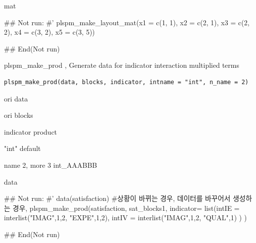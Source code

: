 \documentclass[a4paper]{book}
\begin{document}
%
\begin{Value}
mat
\end{Value}
%
\begin{Examples}
\begin{ExampleCode}

## Not run: 
#'
plspm_make_layout_mat(x1 = c(1, 1),
                      x2 = c(2, 1),
                      x3 = c(2, 2),
                      x4 = c(3, 2),
                      x5 = c(3, 5))

## End(Not run)


\end{ExampleCode}
\end{Examples}
%
\begin{Description}
plspm\_make\_prod , Generate data for indicator interaction multiplied terms
\end{Description}
%
\begin{Usage}
\begin{verbatim}
plspm_make_prod(data, blocks, indicator, intname = "int", n_name = 2)
\end{verbatim}
\end{Usage}
%
\begin{Arguments}
\begin{ldescription}
\item[\code{data}] ori data

\item[\code{blocks}] ori blocks

\item[\code{indicator}] indicator product

\item[\code{intname}] "int" default

\item[\code{n\_name}] name 2, more 3  int\_AAABBB
\end{ldescription}
\end{Arguments}
%
\begin{Value}
data
\end{Value}
%
\begin{Examples}
\begin{ExampleCode}

## Not run: 
#' data(satisfaction)
#상황이 바뀌는 경우, 데이터를 바꾸어서 생성하는 경우,
plspm_make_prod(satisfaction,
                sat_blocks1,
                indicator= list(intIE = interlist("IMAG",1,2, "EXPE",1,2),
                                intIV = interlist("IMAG",1,2, "QUAL",1)  )
) %

## End(Not run)

\end{ExampleCode}
\end{Examples}
\end{document}
